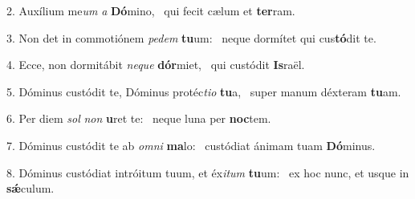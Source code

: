 2. Auxílium me\textit{um} \textit{a} \textbf{Dó}mino, \ast\  qui fecit cælum et \textbf{ter}ram.\

3. Non det in commotiónem \textit{pe}\textit{dem} \textbf{tu}um: \ast\  neque dormítet qui cus\textbf{tó}dit te.\

4. Ecce, non dormitábit \textit{ne}\textit{que} \textbf{dór}miet, \ast\  qui custódit \textbf{Is}raël.\

5. Dóminus custódit te, Dóminus protéc\textit{ti}\textit{o} \textbf{tu}a, \ast\  super manum déxteram \textbf{tu}am.\

6. Per diem \textit{sol} \textit{non} \textbf{u}ret te: \ast\  neque luna per \textbf{noc}tem.\

7. Dóminus custódit te ab \textit{om}\textit{ni} \textbf{ma}lo: \ast\  custódiat ánimam tuam \textbf{Dó}minus.\

8. Dóminus custódiat intróitum tuum, et éx\textit{i}\textit{tum} \textbf{tu}um: \ast\  ex hoc nunc, et usque in \textbf{sǽ}culum.\

